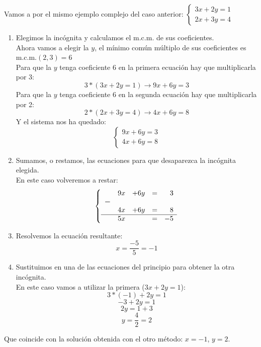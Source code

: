 \documentclass[a4paper,11pt,answers]{exam}
\begin{document}
  Vamos a por el mismo ejemplo complejo del caso anterior:
  $\begin{cases}
     3x+2y = 1\\
     2x+3y = 4
   \end{cases}$
   \begin{solution}
     \begin{enumerate}
     \item Elegimos la incógnita y calculamos el m.c.m. de sus coeficientes.\\
       Ahora vamos a elegir la $y$, el mínimo común múltiplo de sus coeficientes es m.c.m.$(2,3)=6$\\
       Para que la $y$ tenga coeficiente 6 en la primera ecuación hay que multiplicarla
       por 3: \[3*(3x + 2y = 1) \rightarrow 9x +6y = 3\]
       Para que la $y$ tenga coeficiente 6 en la segunda ecuación hay que multiplicarla por 2:
       \[2*(2x + 3y = 4) \rightarrow 4x + 6y = 8\]
       Y el sistema nos ha quedado:
       \[\begin{cases}
           9x + 6y = 3\\
           4x+6y = 8
         \end{cases}\]
     \item Sumamos, o restamos, las ecuaciones para que desaparezca la incógnita elegida.\\
       En este caso volveremos a restar:
       \[\left\lbrace
           \begin{array}{rrrrr}
             &9x&+6y&=&3\\
             \boldsymbol{-}&&&&\\
             &4x&+6y&=&8\\
             \hline
             &5x&&=&-5
           \end{array}
         \right.
       \]
     \item Resolvemos la ecuación resultante:
       \[x = \frac{-5}{5} = -1\]
       
     \item Sustituimos en una de las ecuaciones del principio para obtener la otra incógnita.\\
       En este caso vamos a utilizar la primera ($3x + 2y = 1$):
       \[3*(-1) + 2y = 1\]
       \[-3  + 2y = 1\]
       \[2y = 1+3\]
       \[y = \frac{4}{2} = 2\]
     \end{enumerate}

     Que coincide con la solución obtenida con el otro método: $x = -1$, $y=2$.
   \end{solution}
   
\end{document}

